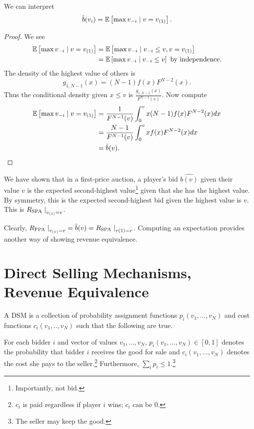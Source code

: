\begin{proposition}	We can interpret \[
		\hat{b}(v_i)= \mathbb{E}\left[\max v_{-i} \mid v = v_{(1)}\right] 
	.\] 
\end{proposition}
\begin{proof}
	We see
	\begin{align*}
		\mathbb{E}\left[\max v_{-i}\mid v = v_{(1)}\right] &= \mathbb{E}\left[\max v_{-i} \mid v_{-i} \le v, v = v_{(1)}\right]  \\
											   &= \mathbb{E}\left[\max v_{-i} \mid v_{-i} \le v\right] \text{ by independence}
	.\end{align*}
	The density of the highest value of others is \[
		g_{1,N-1}(x) = (N-1) f(x) F^{N-2}(x)
	.\] Thus the conditional density given $x \le v$ is $\frac{g_{1,N-1}(x)}{F^{N-1}(v)}$.
	Now compute
	\begin{align*}
		\mathbb{E}\left[\max v_{-i} \mid v = v_{(1)}\right] &= \frac{1}{F^{N-1}(v)} \int_{0}^{v} x (
		N-1) f(x) F^{N-2}(x)dx \\
		&= \frac{N-1}{F^{N-1}(v)} \int_{0}^{v} xf(x) F^{N-2}(x)dx  \\
		&= \hat{b}(v)
	.\end{align*}
\end{proof}

\begin{corollary}
	We have shown that in a first-price auction, a player's bid $\hat{b(v)}$ given their value $v$ is the expected second-highest value\footnote{Importantly, not bid.} given that she has the highest value. By symmetry, this is the expected second-highest bid given the highest value is $v$. This is $R_{\text{SPA}} \left.\right|_{v_{(1)} = v}$.

	Clearly, $R_{\text{FPA}}\left.\right|_{v_{(1)} = v} = \hat{b}(v) = R_{\text{SPA}} \left.\right|_{v(1) = v}$. Computing an expectation provides another way of showing revenue equivalence.
\end{corollary}

\section{Direct Selling Mechanisms, Revenue Equivalence}
\begin{definition}
	A DSM is a collection of probability assignment functions $p_i(v_1,\ldots,v_N)$ and cost functions $c_i(v_1,..,v_N)$ such that the following are true.

	For each bidder $i$ and vector of values $v_1,\ldots,v_N$, $p_i(v_1,\ldots,v_N) \in [0,1]$ denotes the probability that bidder $i$ receives the good for sale and $c_i(v_1,\ldots,v_N)$ denotes the cost she pays to the seller.\footnote{$c_i$ is paid regardless if player $i$ wins; $c_i$ can be $0$.} Furthermore, $\sum_i p_i \le 1$.\footnote{The seller may keep the good.}
\end{definition}

